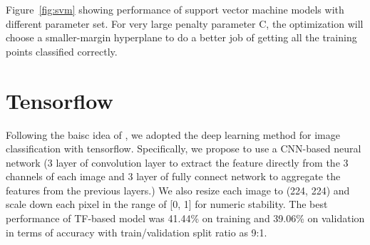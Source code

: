 \documentclass[a4paper, 11pt]{article}
\begin{document}
Figure~\ref{fig:svm} showing performance of support vector machine models with different parameter set. For very large penalty parameter C, the optimization will choose a smaller-margin hyperplane to do a better job of getting all the training points classified correctly. 

\section*{Tensorflow}
Following the baisc idea of \cite{krizhevsky2012imagenet}, we adopted the deep learning method for image classification with tensorflow. Specifically, we propose to use a CNN-based neural network (3 layer of convolution layer to extract the feature directly from the 3 channels of each image and 3 layer of fully connect network to aggregate the features from the previous layers.) We also resize each image to (224, 224) and scale down each pixel in the range of [0, 1] for numeric stability. The best performance of TF-based model was 41.44\% on training and 39.06\% on validation in terms of accuracy with train/validation split ratio as 9:1.
\end{document}
